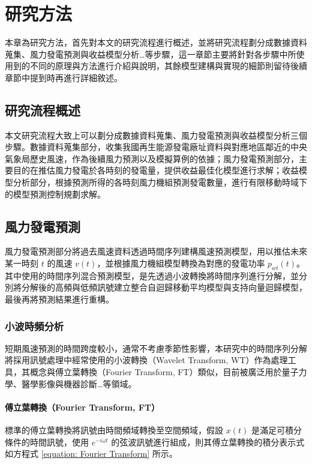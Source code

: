 
\chapter{研究方法}

本章為研究方法，首先對本文的研究流程進行概述，並將研究流程劃分成數據資料蒐集、風力發電預測與收益模型分析…等步驟，這一章節主要將針對各步驟中所使用到的不同的原理與方法進行介紹與說明，其餘模型建構與實現的細節則留待後續章節中提到時再進行詳細敘述。

\section{研究流程概述}

本文研究流程大致上可以劃分成數據資料蒐集、風力發電預測與收益模型分析三個步驟。數據資料蒐集部分，收集我國再生能源發電廠址資料與對應地區鄰近的中央氣象局歷史風速，作為後續風力預測以及模擬算例的依據；風力發電預測部分，主要目的在推估風力發電於各時刻的發電量，提供收益最佳化模型進行求解；收益模型分析部分，根據預測所得的各時刻風力機組預測發電數量，進行有限移動時域下的模型預測控制規劃求解。

\section{風力發電預測}

風力發電預測部分將過去風速資料透過時間序列建構風速預測模型，用以推估未來某一時刻 $t$ 的風速 $v(t)$，並根據風力機組模型轉換為對應的發電功率 $p_{wt}(t)$。其中使用的時間序列混合預測模型，是先透過小波轉換將時間序列進行分解，並分別將分解後的高頻與低頻訊號建立整合自迴歸移動平均模型與支持向量迴歸模型，最後再將預測結果進行重構。

\subsection{小波時頻分析}

短期風速預測的時間跨度較小，通常不考慮季節性影響，本研究中的時間序列分解將採用訊號處理中經常使用的小波轉換（Wavelet Transform, WT）作為處理工具，其概念與傅立葉轉換（Fourier Transform, FT）類似，目前被廣泛用於量子力學、醫學影像與機器診斷…等領域。

\subsubsection{傅立葉轉換（Fourier Transform, FT）}

標準的傅立葉轉換將訊號由時間頻域轉換至空間頻域，假設 $x(t)$ 是滿足可積分條件的時間訊號，使用 $e^{-i \omega t}$ 的弦波訊號進行組成，則其傅立葉轉換的積分表示式如方程式 \eqref{equation: Fourier Transform} 所示。

